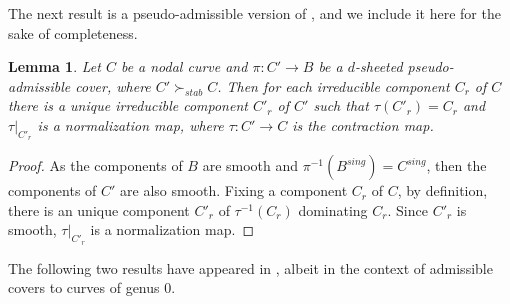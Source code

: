 \documentclass{article}
\newtheorem{lemma}[theorem]{Lemma}
\newcommand{\steq}{\succ_{stab}}
\renewcommand{\:}{\colon }
\begin{document}
The next result is a pseudo-admissible version of \cite[Lemma 3.2]{paper1}, and we include it here for the sake of completeness. 

\begin{lemma}\label{lemma:components}%
    Let $C$ be a nodal curve and $\pi:{C}'\rightarrow B$ be a  $d$-sheeted pseudo-admissible cover, where $C'\steq C$. Then for each irreducible component $C_r$ of $C$ there is a unique irreducible component ${C}'_r$ of ${C}'$ such that $\tau({C}'_r)= C_r$ and $\tau|_{{C}'_r}$ is a normalization map, where $\tau\:C'\rightarrow C$ is the contraction map.
\end{lemma}
\begin{proof}
    As the components of $B$ are smooth and $\pi^{-1}(B^{sing})= C^{sing}$, then the components of ${C}'$ are also smooth. Fixing a component $C_r$ of $C$, by definition, there is an unique component ${C}'_r$ of $\tau^{-1}(C_r)$ dominating $C_r$. Since ${C}'_r$ is smooth, $\tau|_{{C}'_r}$ is a normalization map.
\end{proof}



The following two results have appeared in \cite{paper1}, albeit in the context of admissible covers to curves of genus 0.


\end{document}
